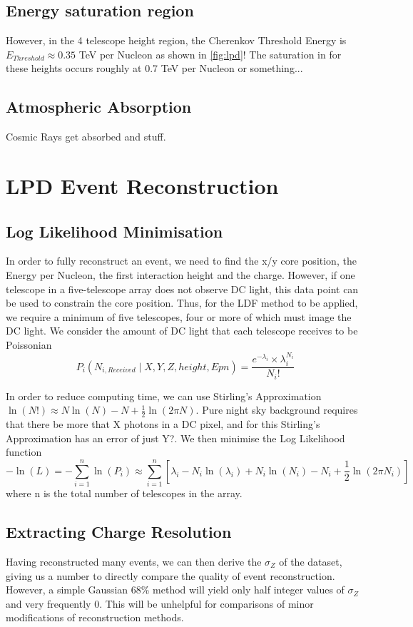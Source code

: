 \documentclass{article}
\begin{document}
\subsection{Energy saturation region}
However, in the 4 telescope height region, the Cherenkov Threshold Energy is $ E_{Threshold} \approx 0.35$ TeV per Nucleon as shown in \ref{fig:lpd}! The saturation in for these heights occurs roughly at 0.7 TeV per Nucleon or something...

\subsection{Atmospheric Absorption}
Cosmic Rays get absorbed and stuff.

\section{LPD Event Reconstruction}

\subsection{Log Likelihood Minimisation}
In order to fully reconstruct an event, we need to find the x/y core position, the Energy per Nucleon, the first interaction height and the charge. However, if one telescope in a five-telescope array does not observe DC light, this data point can be used to constrain the core position. Thus, for the LDF method to be applied, we require a minimum of five telescopes, four or more of which must image the DC light. We consider the amount of DC light that each telescope receives to be Poissonian \[  P_{i} ( N_{i, Received} \mid X, Y, Z, height, Epn )  =  \frac{ e^{- \lambda_{i} } \times \lambda_{i} ^{N_{i}} }{N_{i}!} \]

In order to reduce computing time, we can use Stirling's Approximation $\ln( N! )  \approx  N \ln(N) - N + \frac{1}{2} \ln(2 \pi N)$. Pure night sky background requires that there be more that X photons in a DC pixel, and for this Stirling's Approximation has an error of just Y?. We then minimise the Log Likelihood function \[ - \ln(L) = - \sum_{i=1}^{n} \ln(P_{i}) \approx  \sum_{i=1}^{n} [\lambda _{i} - N_{i} \ln(\lambda _{i}) + N_{i} \ln(N_{i}) - N_{i} + \frac{1}{2} \ln(2 \pi N_{i})]  \] where n is the total number of telescopes in the array.

\subsection{Extracting Charge Resolution}
Having reconstructed many events, we can then derive the $\sigma_{Z}$ of the dataset, giving us a number to directly compare the quality of event reconstruction. However, a simple Gaussian 68\% method will yield only half integer values of $\sigma_{Z}$ and very frequently 0. This will be unhelpful for comparisons of minor modifications of reconstruction methods.
\end{document}
